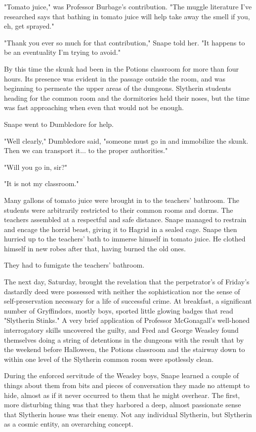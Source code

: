 "Tomato juice," was Professor Burbage's contribution. "The muggle literature I've researched says that bathing in tomato juice will help take away the smell if you, eh, get sprayed."

"Thank you ever so much for that contribution," Snape told her. "It happens to be an eventuality I'm trying to avoid."

By this time the skunk had been in the Potions classroom for more than four hours. Its presence was evident in the passage outside the room, and was beginning to permeate the upper areas of the dungeons. Slytherin students heading for the common room and the dormitories held their noses, but the time was fast approaching when even that would not be enough.

Snape went to Dumbledore for help.

"Well clearly," Dumbledore said, "someone must go in and immobilize the skunk. Then we can transport it... to the proper authorities."

"Will you go in, sir?"

"It is not my classroom."

Many gallons of tomato juice were brought in to the teachers' bathroom. The students were arbitrarily restricted to their common rooms and dorms. The teachers assembled at a respectful and safe distance. Snape managed to restrain and encage the horrid beast, giving it to Hagrid in a sealed cage. Snape then hurried up to the teachers' bath to immerse himself in tomato juice. He clothed himself in new robes after that, having burned the old ones.

They had to fumigate the teachers' bathroom.

The next day, Saturday, brought the revelation that the perpetrator's of Friday's dastardly deed were possessed with neither the sophistication nor the sense of self-preservation necessary for a life of successful crime. At breakfast, a significant number of Gryffindors, mostly boys, sported little glowing badges that read "Slytherin Stinks." A very brief application of Professor McGonagall's well-honed interrogatory skills uncovered the guilty, and Fred and George Weasley found themselves doing a string of detentions in the dungeons with the result that by the weekend before Halloween, the Potions classroom and the stairway down to within one level of the Slytherin common room were spotlessly clean.

During the enforced servitude of the Weasley boys, Snape learned a couple of things about them from bits and pieces of conversation they made no attempt to hide, almost as if it never occurred to them that he might overhear. The first, more disturbing thing was that they harbored a deep, almost passionate sense that Slytherin house was their enemy. Not any individual Slytherin, but Slytherin as a cosmic entity, an overarching concept.

